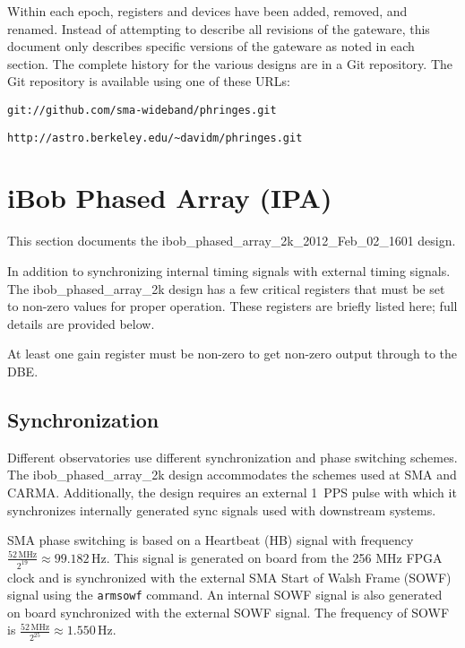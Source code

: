 \documentclass[12pt]{article}
\begin{document}
Within each epoch, registers and devices have been added, removed, and renamed.
Instead of attempting to describe all revisions of the gateware, this document
only describes specific versions of the gateware as noted in each section.  The
complete history for the various designs are in a Git repository.  The
Git repository is available using one of these URLs:

\begin{center}
\nolinkurl{git://github.com/sma-wideband/phringes.git}
\end{center}

\begin{center}
\nolinkurl{http://astro.berkeley.edu/~davidm/phringes.git}
\end{center}

\newpage
\section{iBob Phased Array (IPA)}

This section documents the ibob\_phased\_array\_2k\_2012\_Feb\_02\_1601 design.

In addition to synchronizing internal timing signals with external timing
signals.  The ibob\_phased\_array\_2k design has a few critical registers that
must be set to non-zero values for proper operation.  These registers are
briefly listed here; full details are provided below.

\begin{description}
 At least one gain register must be non-zero to get
non-zero output through to the DBE.
\end{description}

  \subsection{Synchronization}

Different observatories use different synchronization and phase switching
schemes.  The ibob\_phased\_array\_2k design accommodates the schemes used at
SMA and CARMA.  Additionally, the design requires an external 1~PPS pulse with
which it synchronizes internally generated sync signals used with downstream
systems.

SMA phase switching is based on a Heartbeat (HB) signal with frequency
$\frac{52 \, \mathrm{MHz}}{2^{19}} \approx 99.182 \, \mathrm{Hz}$.  This signal
is generated on board from the 256 MHz FPGA clock and is synchronized with the
external SMA Start of Walsh Frame (SOWF) signal using the \verb|armsowf|
command.  An internal SOWF signal is also generated on board synchronized with
the external SOWF signal.  The frequency of SOWF is $\frac{52 \,
\mathrm{MHz}}{2^{25}} \approx 1.550 \, \mathrm{Hz}$.
\end{document}
